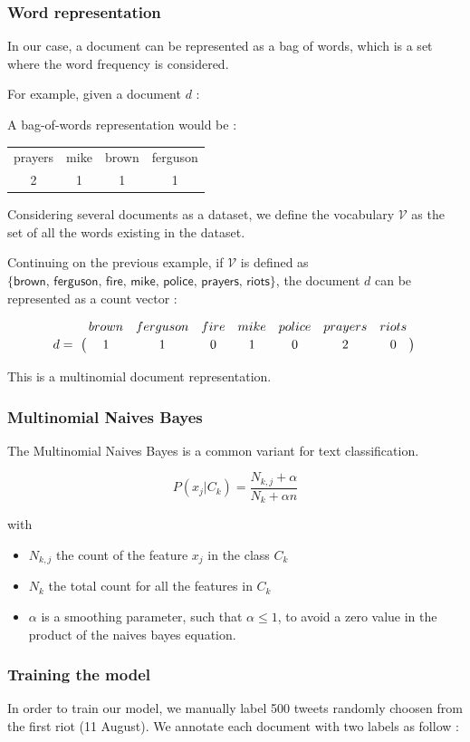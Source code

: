 \documentclass[a4paper,twoside,12pt,openright]{report}
\begin{document}
\subsubsection{Word representation}

In our case, a document can be represented as a bag of words, which is a set where the word frequency is considered.

For example, given a document $d$ : 

A bag-of-words representation would be :
\begin{center}
\begin{tabular}{|c|c|c|c|}
prayers & mike & brown & ferguson \\
2 & 1 & 1 & 1
\end{tabular}
\end{center}

Considering several documents as a dataset, we define the vocabulary $\mathcal{V}$ as the set of all the words existing in the dataset.

Continuing on the previous example, if $\mathcal{V}$ is defined as $\{\textsf{brown, ferguson, fire, mike, police, prayers, riots}\}$, the document $d$ can be represented as a count vector :

$$
\bordermatrix{~ & brown & ferguson & fire & mike & police & prayers & riots \cr d =  & 1 & 1 & 0 & 1 & 0 & 2 & 0 \cr}
$$

This is a multinomial document representation.

\subsubsection{Multinomial Naives Bayes}
The Multinomial Naives Bayes is a common variant for text classification.

$$ 
\boxed{P(x_{j}| C_k ) = \frac{N_{k,j} + \alpha}{N_k + \alpha n}}
$$

with 
\begin{itemize}
\item $N_{k,j}$ the count of the feature $x_j$ in the class $C_k$
\item $N_{k}$ the total count for all the features in $C_k$
\item $\alpha$ is a smoothing parameter, such that $\alpha \leq 1$, to avoid a zero value in the product of the naives bayes equation.
\end{itemize}


\subsubsection{Training the model}
In order to train our model, we manually label 500 tweets randomly choosen from the first riot (11 August). We annotate each document with two labels as follow : 
\end{document}
